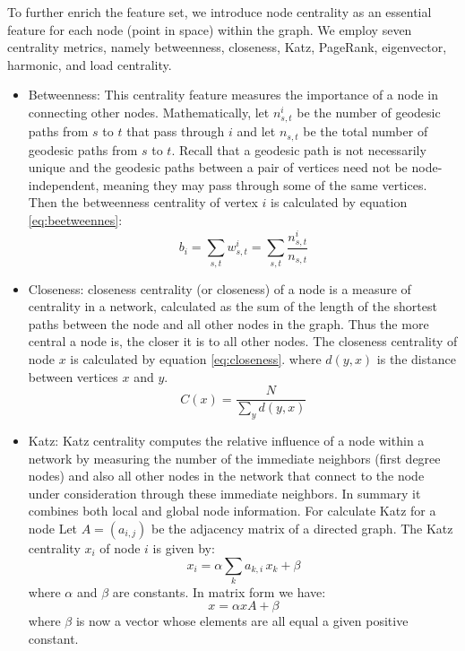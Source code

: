 \documentclass[conference]{IEEEtran}
\begin{document}
To further enrich the feature set, we introduce node centrality as an essential feature for each node (point in space)
 within the graph. We employ seven centrality metrics, namely betweenness, closeness, Katz, PageRank, eigenvector, harmonic,
  and load centrality.
\begin{itemize}
    \item Betweenness: This centrality feature measures the importance of a node in connecting other nodes.
    Mathematically, let $n_{s,t}^{i}$ be the number of geodesic paths from $s$ to $t$ that pass through $i$ and 
    let $n_{s,t}$ be the total number of geodesic paths from $s$ to $t$. Recall that a geodesic path is not necessarily 
    unique and the geodesic paths between a pair of vertices need not be node-independent, meaning they may pass through 
    some of the same vertices. Then the betweenness centrality of vertex $i$ is calculated by equation \ref{eq:beetweennes}:
    \begin{equation}\label{eq:beetweennes}
        b_i = \sum_{s, t} w_{s,t}^{i} = \sum_{s, t} \frac{n_{s,t}^{i}}{n_{s,t}}
    \end{equation}
    \item Closeness: closeness centrality (or closeness) of a node is a measure of centrality in a network, 
    calculated as the sum of the length of the shortest paths between the node and all other nodes in the graph.
    Thus the more central a node is, the closer it is to all other nodes. The closeness centrality of node $x$ is calculated by equation \ref{eq:closeness}.
    where $d(y,x)$ is the distance between vertices $x$ and $y$.
    \begin{equation}\label{eq:closeness}
        C(x) = \frac{N}{\sum_{y}^{}d(y,x)}
    \end{equation}
    \item Katz: Katz centrality computes the relative influence of a node within a network by measuring
     the number of the immediate neighbors (first degree nodes) and also all other nodes in the network that connect
      to the node under consideration through these immediate neighbors. In summary it combines both local and global node information.
      For calculate Katz for a node Let $A = (a_{i,j})$ be the adjacency matrix of a directed graph. The Katz centrality $x_{i}$ of node $i$ is given by: $$x_i = \alpha \sum_k a_{k,i} \, x_k + \beta$$ where $\alpha$ and $\beta$ are constants. In matrix form we have: $$x = \alpha x A + \beta$$ where $\beta$ is now a vector whose elements are all equal a given positive constant. 

\end{itemize}
\end{document}
